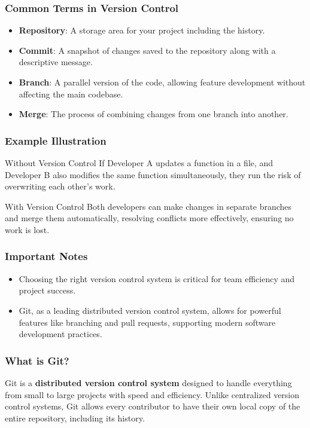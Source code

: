 \documentclass{beamer}
\begin{document}
\begin{frame}[fragile]
    \frametitle{Common Terms in Version Control}
    \begin{itemize}
        \item \textbf{Repository}: A storage area for your project including the history.
        \item \textbf{Commit}: A snapshot of changes saved to the repository along with a descriptive message.
        \item \textbf{Branch}: A parallel version of the code, allowing feature development without affecting the main codebase.
        \item \textbf{Merge}: The process of combining changes from one branch into another.
    \end{itemize}
\end{frame}

\begin{frame}[fragile]
    \frametitle{Example Illustration}
    \begin{block}{Without Version Control}
        If Developer A updates a function in a file, and Developer B also modifies the same function simultaneously, they run the risk of overwriting each other's work.
    \end{block}
    \begin{block}{With Version Control}
        Both developers can make changes in separate branches and merge them automatically, resolving conflicts more effectively, ensuring no work is lost.
    \end{block}
\end{frame}

\begin{frame}[fragile]
    \frametitle{Important Notes}
    \begin{itemize}
        \item Choosing the right version control system is critical for team efficiency and project success.
        \item Git, as a leading distributed version control system, allows for powerful features like branching and pull requests, supporting modern software development practices.
    \end{itemize}
\end{frame}

\begin{frame}[fragile]
    \frametitle{What is Git?}
    Git is a \textbf{distributed version control system} designed to handle everything from small to large projects with speed and efficiency. Unlike centralized version control systems, Git allows every contributor to have their own local copy of the entire repository, including its history.
\end{frame}
\end{document}
